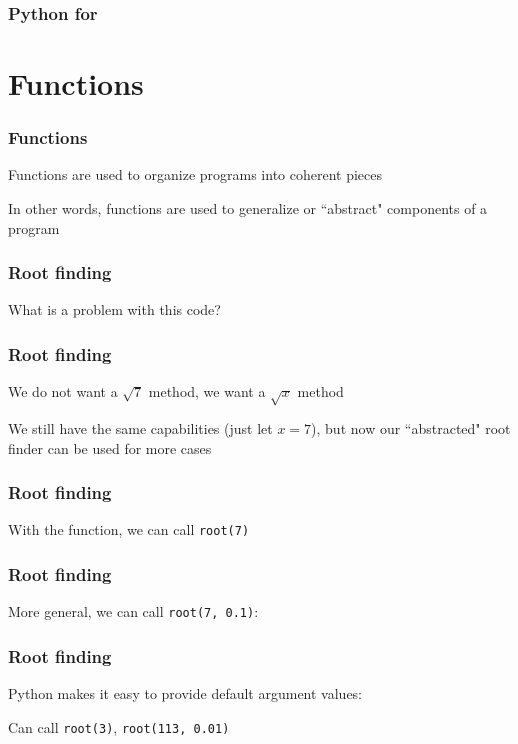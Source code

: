 \documentclass{beamer}
\begin{document}
\begin{frame}
\frametitle{Python for}



\end{frame}


\section{Functions}
\begin{frame}
\frametitle{Functions}
Functions are used to organize programs into coherent pieces

\vspace{0.2in}

In other words, functions are used to generalize or ``abstract" components of a program 
\end{frame}


\begin{frame}
\frametitle{Root finding}

What is a problem with this code?



\end{frame}

\begin{frame}
\frametitle{Root finding}
We do not want a $\sqrt{7}$ method, we want a $\sqrt{x}$ method

\vspace{0.2in}

We still have the same capabilities (just let $x = 7$), but now our ``abstracted" root finder can be used for more cases
\end{frame}


\begin{frame}
\frametitle{Root finding}

With the function, we can call \texttt{root(7)}



\end{frame}

\begin{frame}
\frametitle{Root finding}
More general, we can call \texttt{root(7, 0.1)}:



\end{frame}


\begin{frame}
\frametitle{Root finding}
Python makes it easy to provide default argument values:



Can call \texttt{root(3)}, \texttt{root(113, 0.01)}
\end{frame}
\end{document}
